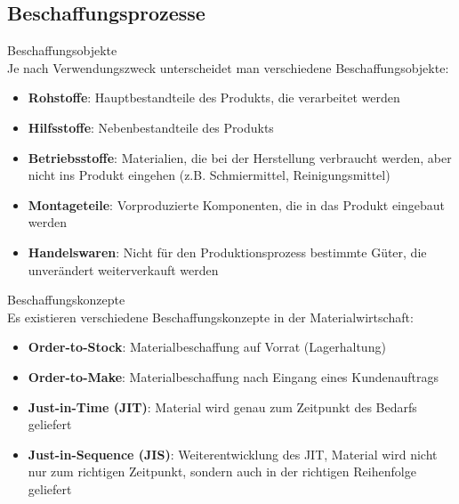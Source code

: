 \subsection{Beschaffungsprozesse}

\begin{definition}{Beschaffungsobjekte}\\
Je nach Verwendungszweck unterscheidet man verschiedene Beschaffungsobjekte:
\begin{itemize}
    \item \textbf{Rohstoffe}: Hauptbestandteile des Produkts, die verarbeitet werden
    \item \textbf{Hilfsstoffe}: Nebenbestandteile des Produkts
    \item \textbf{Betriebsstoffe}: Materialien, die bei der Herstellung verbraucht werden, aber nicht ins Produkt eingehen (z.B. Schmiermittel, Reinigungsmittel)
    \item \textbf{Montageteile}: Vorproduzierte Komponenten, die in das Produkt eingebaut werden
    \item \textbf{Handelswaren}: Nicht für den Produktionsprozess bestimmte Güter, die unverändert weiterverkauft werden
\end{itemize}
\end{definition}

\begin{definition}{Beschaffungskonzepte}\\
Es existieren verschiedene Beschaffungskonzepte in der Materialwirtschaft:
\begin{itemize}
    \item \textbf{Order-to-Stock}: Materialbeschaffung auf Vorrat (Lagerhaltung)
    \item \textbf{Order-to-Make}: Materialbeschaffung nach Eingang eines Kundenauftrags
    \item \textbf{Just-in-Time (JIT)}: Material wird genau zum Zeitpunkt des Bedarfs geliefert
    \item \textbf{Just-in-Sequence (JIS)}: Weiterentwicklung des JIT, Material wird nicht nur zum richtigen Zeitpunkt, sondern auch in der richtigen Reihenfolge geliefert
\end{itemize}
\end{definition}

